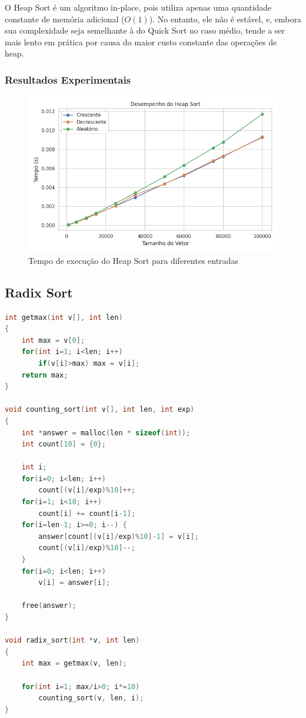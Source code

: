 O Heap Sort é um algoritmo in-place, pois utiliza apenas uma quantidade constante de memória adicional (\(O(1)\)). No
entanto, ele não é estável, e, embora sua complexidade seja semelhante à do Quick Sort no caso médio, tende a ser mais
lento em prática por causa do maior custo constante das operações de heap.~\cite{geeksforgeeks_heap_sort}

\subsubsection{Resultados Experimentais}
\begin{figure}[H]
    \centering
    \includegraphics[width=1\textwidth]{../codigos/resultados/heap_grafico.png}
    \caption{Tempo de execução do Heap Sort para diferentes entradas}
    \label{fig:heap-grafico}
\end{figure}

\subsection{Radix Sort}
\begin{lstlisting}[language=C, caption={Implementação do Radix Sort}, label={lst:radix}]
int getmax(int v[], int len)
{
    int max = v[0];
    for(int i=1; i<len; i++)
        if(v[i]>max) max = v[i];
    return max;
}

void counting_sort(int v[], int len, int exp)
{
    int *answer = malloc(len * sizeof(int));
    int count[10] = {0};

    int i;
    for(i=0; i<len; i++)
        count[(v[i]/exp)%10]++;
    for(i=1; i<10; i++)
        count[i] += count[i-1];
    for(i=len-1; i>=0; i--) {
        answer[count[(v[i]/exp)%10]-1] = v[i];
        count[(v[i]/exp)%10]--;
    }
    for(i=0; i<len; i++)
        v[i] = answer[i];

    free(answer);
}

void radix_sort(int *v, int len)
{
    int max = getmax(v, len);

    for(int i=1; max/i>0; i*=10)
        counting_sort(v, len, i);
}
\end{lstlisting}

